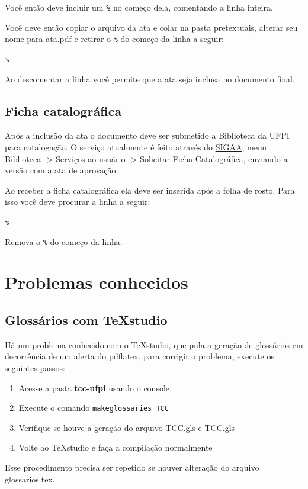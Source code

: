 Você então deve incluir um \verb|%| no começo dela, comentando a linha inteira.

Você deve então copiar o arquivo da ata e colar na pasta pretextuais, alterar seu nome para ata.pdf e retirar o \verb|%| do começo da linha a seguir:  
\par\verb|% | \par
Ao descomentar a linha você permite que a ata seja inclusa no documento final. 

\subsection{Ficha catalográfica}

Após a inclusão da ata o documento deve ser submetido a Biblioteca da UFPI para catalogação. O serviço atualmente é feito através do \href{http://sigaa.ufpi.br}{SIGAA}, menu Biblioteca -> Serviços ao usuário -> Solicitar Ficha Catalográfica, enviando a versão com a ata de aprovação. 

Ao receber a ficha catalográfica ela deve ser inserida após a folha de rosto. Para isso você deve procurar a linha a seguir: 
\par\verb|% | \par
Remova o \verb|%| do começo da linha. 

\section{Problemas conhecidos}

\subsection{Glossários com TeXstudio}
Há um problema conhecido com o \href{https://www.texstudio.org/}{TeXstudio}, que pula a geração de glossários em decorrência de um alerta do pdflatex, para corrigir o problema, execute os seguintes passos:

\begin{enumerate}
	\item Acesse a pasta \textbf{tcc-ufpi} usando o console.
	\item Execute o comando \verb|makeglossaries TCC|
	\item Verifique se houve a geração do arquivo TCC.gls e TCC.gls
	\item Volte ao TeXstudio e faça a compilação normalmente 
\end{enumerate}

Esse procedimento precisa ser repetido se houver alteração do arquivo glossarios.tex.


